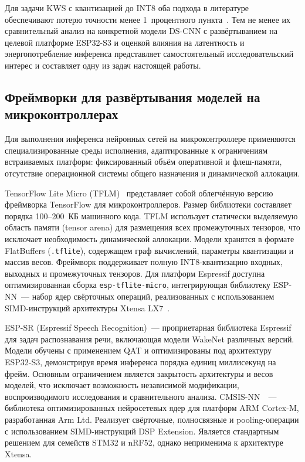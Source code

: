 Для задачи KWS с квантизацией до INT8 оба подхода в литературе
обеспечивают потерю точности менее 1~процентного пункта~\cite{src:1,
	src:3}. Тем не менее их сравнительный анализ на конкретной модели DS-CNN
с развёртыванием на целевой платформе ESP32-S3 и оценкой влияния на
латентность и энергопотребление инференса представляет самостоятельный
исследовательский интерес и составляет одну из задач настоящей работы.

\subsection{Фреймворки для развёртывания моделей на микроконтроллерах}

Для выполнения инференса нейронных сетей на микроконтроллере применяются
специализированные среды исполнения, адаптированные к
ограничениям встраиваемых платформ: фиксированный объём оперативной и
флеш-памяти, отсутствие операционной системы общего назначения и
динамической аллокации.

TensorFlow Lite Micro (TFLM)~\cite{src:4} представляет собой облегчённую
версию фреймворка TensorFlow для микроконтроллеров. Размер библиотеки
составляет порядка 100--200~КБ машинного кода. TFLM использует
статически выделяемую область памяти (tensor arena) для размещения всех
промежуточных тензоров, что исключает необходимость динамической
аллокации. Модели хранятся в формате FlatBuffers (\texttt{.tflite}),
содержащем граф вычислений, параметры квантизации и массив весов.
Фреймворк поддерживает полную INT8-квантизацию входных, выходных и
промежуточных тензоров. Для платформ Espressif доступна оптимизированная
сборка \texttt{esp-tflite-micro}, интегрирующая библиотеку ESP-NN~---
набор ядер свёрточных операций, реализованных с использованием
SIMD-инструкций архитектуры Xtensa LX7~\cite{src:9}.

ESP-SR (Espressif Speech Recognition)~--- проприетарная
библиотека Espressif для задач распознавания речи, включающая модели
WakeNet различных версий. Модели обучены с применением QAT и
оптимизированы под архитектуру ESP32-S3, демонстрируя время инференса
порядка единиц миллисекунд на фрейм. Основным ограничением является
закрытость архитектуры и весов моделей, что исключает возможность
независимой модификации, воспроизводимого исследования и сравнительного
анализа. CMSIS-NN~\cite{src:13}~--- библиотека оптимизированных
нейросетевых ядер для платформ ARM Cortex-M, разработанная Arm Ltd.
Реализует свёрточные, полносвязные и pooling-операции с использованием
SIMD-инструкций DSP Extension. Является стандартным решением для
семейств STM32 и nRF52, однако неприменима к архитектуре Xtensa.

